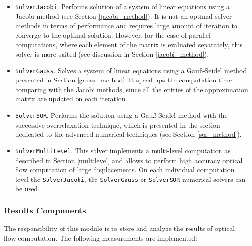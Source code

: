 \begin{itemize}
\item \texttt{SolverJacobi}. Performs solution of a system of linear equations using a Jacobi method (see Section \ref{jacobi_method}). It is not an optimal solver methods in terms of performance and requires large amount of iteration to converge to the optimal solution. However, for the case of parallel computations, where each element of the matrix is evaluated separately, this solver is more suited (see discussion in Section \ref{jacobi_method}). 

\item \texttt{SolverGauss}. Solves a system of linear equations using a Gau\ss-Seidel method presented in Section \ref{gauss_method}. It speed ups the computation time comparing with the Jacobi methods, since all the entries of the approximation matrix are updated on each iteration. 

\item \texttt{SolverSOR}. Performs the solution using a Gau\ss-Seidel method with the successive overrelaxation technique, which is presented in the section dedicated to the advanced numerical techniques (see Section \ref{sor_method}).

\item \texttt{SolverMultiLevel}. This solver implements a multi-level computation as described in Section \ref{multilevel} and allows to perform high accuracy optical flow computation of large displacements. On each individual computation level the \texttt{SolverJacobi}, the \texttt{SolverGauss} or \texttt{SolverSOR} numerical solvers can be used.

\end{itemize}


\subsubsection {Results Components}
\label{components_results}

The responsibility of this module is to store and analyze the results of optical flow computation.
The following measurements are implemented:

